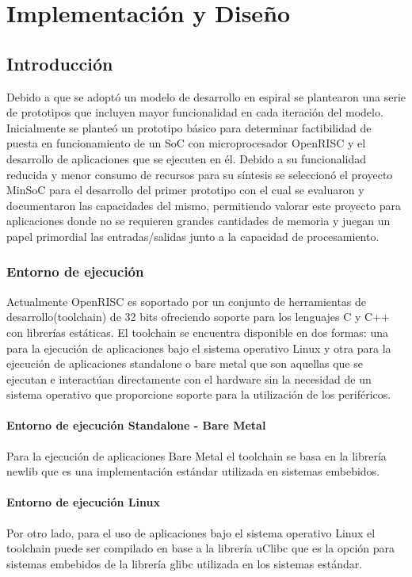 \chapter{Implementación y Diseño}
	\section{Introducción}
	Debido a que se adoptó un modelo de desarrollo en espiral se plantearon una serie de prototipos que incluyen mayor funcionalidad en cada iteración
	del modelo. Inicialmente se planteó un prototipo básico para determinar factibilidad de puesta en funcionamiento de un SoC con microprocesador
	OpenRISC y el desarrollo de aplicaciones que se ejecuten en él. Debido a su funcionalidad reducida y menor consumo de recursos  para su síntesis se
	seleccionó el proyecto MinSoC para el desarrollo del primer prototipo con el cual se evaluaron y documentaron las capacidades del mismo, permitiendo
	valorar este proyecto para aplicaciones donde no se requieren grandes cantidades de memoria y juegan un papel primordial las entradas/salidas junto
	a la capacidad de procesamiento.  
		 
		\subsection{Entorno de ejecución}
		Actualmente OpenRISC es soportado por un conjunto de herramientas de desarrollo(toolchain) de 32 bits ofreciendo soporte para los lenguajes C y C++
		con librerías estáticas. El toolchain se encuentra disponible en dos formas: una para la ejecución de aplicaciones bajo el sistema operativo Linux y
		otra para la ejecución de aplicaciones standalone o bare metal que son aquellas que se ejecutan e interactúan directamente con el hardware sin la
		necesidad de un sistema operativo que proporcione soporte para la utilización de los periféricos.
		
			\subsubsection{Entorno de ejecución Standalone - Bare Metal}
	    	Para la ejecución de aplicaciones Bare Metal el toolchain se basa en la librería newlib que es una implementación estándar utilizada en
	    	sistemas embebidos. 
	    
			\subsubsection{Entorno de ejecución Linux}
			Por otro lado, para el uso de aplicaciones bajo el sistema operativo Linux el toolchain puede ser compilado en base a la librería uClibc que es la
			opción para sistemas embebidos de la librería glibc utilizada en los sistemas estándar.
		
